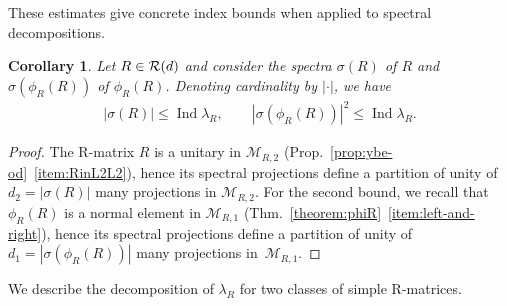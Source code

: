 \documentclass[12pt,a4paper]{amsart}
\numberwithin{equation}{section}
\newtheorem{corollary}[theorem]{Corollary}
\theoremstyle{remark}
\def\Ind{\operatorname{Ind}}
\newcommand{\la}{\lambda}
\newcommand{\CM}[0]{\mathcal{M}} \newcommand{\CN}[0]{\mathcal{N}}
\begin{document}
These estimates give concrete index bounds when applied to spectral decompositions.

\begin{corollary}\label{corollary:spectralindexbounds}
    Let $R\in\mathcal{R}(d)$ and consider the spectra $\sigma(R)$ of $R$ and $\sigma(\phi_R(R))$ of $\phi_R(R)$. Denoting cardinality by $|\cdot|$, we have
    \begin{align}\label{eq:lowerindexbounds}
        |\sigma(R)|\leq\Ind\la_R,\qquad |\sigma(\phi_R(R))|^2\leq \Ind\la_R.
    \end{align}
\end{corollary}
\begin{proof}
    The R-matrix $R$ is a unitary in $\CM_{R,2}$ (Prop.~\ref{prop:ybe-od}~\ref{item:RinL2L2}), hence its spectral projections define a partition of unity of $d_2=|\sigma(R)|$ many projections in $\CM_{R,2}$. For the second bound, we recall that $\phi_R(R)$ is a normal element in $\CM_{R,1}$ (Thm.~\ref{theorem:phiR}~\ref{item:left-and-right}), hence its spectral projections define a partition of unity of $d_1=|\sigma(\phi_R(R))|$ many projections in~$\CM_{R,1}$.
\end{proof}


We describe the decomposition of $\la_R$ for two classes of simple R-matrices.
\end{document}
